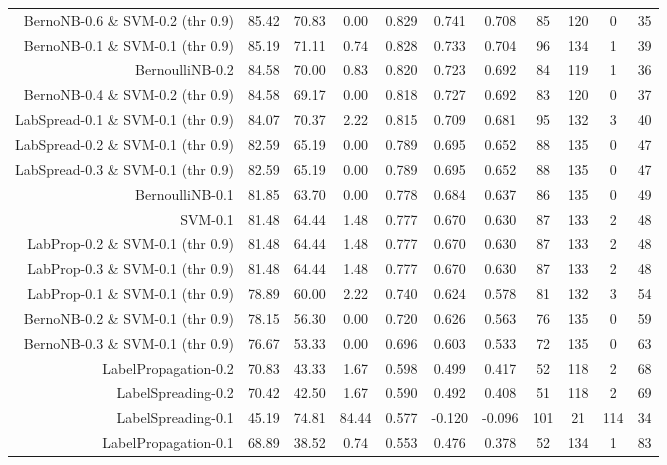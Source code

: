 \begin{table}[!htb]
\begin{tabular}{r|c|c|c|c|c|c|c|c|c|c}
BernoNB-0.6 \& SVM-0.2 (thr 0.9) & 85.42 & 70.83 & 0.00 & 0.829 & 0.741 & 0.708 & 85 & 120 & 0 & 35 \\ 
BernoNB-0.1 \& SVM-0.1 (thr 0.9) & 85.19 & 71.11 & 0.74 & 0.828 & 0.733 & 0.704 & 96 & 134 & 1 & 39 \\ 
BernoulliNB-0.2 & 84.58 & 70.00 & 0.83 & 0.820 & 0.723 & 0.692 & 84 & 119 & 1 & 36 \\ 
BernoNB-0.4 \& SVM-0.2 (thr 0.9) & 84.58 & 69.17 & 0.00 & 0.818 & 0.727 & 0.692 & 83 & 120 & 0 & 37 \\ 
LabSpread-0.1 \& SVM-0.1 (thr 0.9) & 84.07 & 70.37 & 2.22 & 0.815 & 0.709 & 0.681 & 95 & 132 & 3 & 40 \\ 
LabSpread-0.2 \& SVM-0.1 (thr 0.9) & 82.59 & 65.19 & 0.00 & 0.789 & 0.695 & 0.652 & 88 & 135 & 0 & 47 \\ 
LabSpread-0.3 \& SVM-0.1 (thr 0.9) & 82.59 & 65.19 & 0.00 & 0.789 & 0.695 & 0.652 & 88 & 135 & 0 & 47 \\ 
BernoulliNB-0.1 & 81.85 & 63.70 & 0.00 & 0.778 & 0.684 & 0.637 & 86 & 135 & 0 & 49 \\ 
SVM-0.1 & 81.48 & 64.44 & 1.48 & 0.777 & 0.670 & 0.630 & 87 & 133 & 2 & 48 \\ 
LabProp-0.2 \& SVM-0.1 (thr 0.9) & 81.48 & 64.44 & 1.48 & 0.777 & 0.670 & 0.630 & 87 & 133 & 2 & 48 \\ 
LabProp-0.3 \& SVM-0.1 (thr 0.9) & 81.48 & 64.44 & 1.48 & 0.777 & 0.670 & 0.630 & 87 & 133 & 2 & 48 \\ 
LabProp-0.1 \& SVM-0.1 (thr 0.9) & 78.89 & 60.00 & 2.22 & 0.740 & 0.624 & 0.578 & 81 & 132 & 3 & 54 \\ 
BernoNB-0.2 \& SVM-0.1 (thr 0.9) & 78.15 & 56.30 & 0.00 & 0.720 & 0.626 & 0.563 & 76 & 135 & 0 & 59 \\ 
BernoNB-0.3 \& SVM-0.1 (thr 0.9) & 76.67 & 53.33 & 0.00 & 0.696 & 0.603 & 0.533 & 72 & 135 & 0 & 63 \\ 
LabelPropagation-0.2 & 70.83 & 43.33 & 1.67 & 0.598 & 0.499 & 0.417 & 52 & 118 & 2 & 68 \\ 
LabelSpreading-0.2 & 70.42 & 42.50 & 1.67 & 0.590 & 0.492 & 0.408 & 51 & 118 & 2 & 69 \\ 
LabelSpreading-0.1 & 45.19 & 74.81 & 84.44 & 0.577 & -0.120 & -0.096 & 101 & 21 & 114 & 34 \\ 
LabelPropagation-0.1 & 68.89 & 38.52 & 0.74 & 0.553 & 0.476 & 0.378 & 52 & 134 & 1 & 83 \\ 
\hline\hline
\end{tabular}
\end{table}
